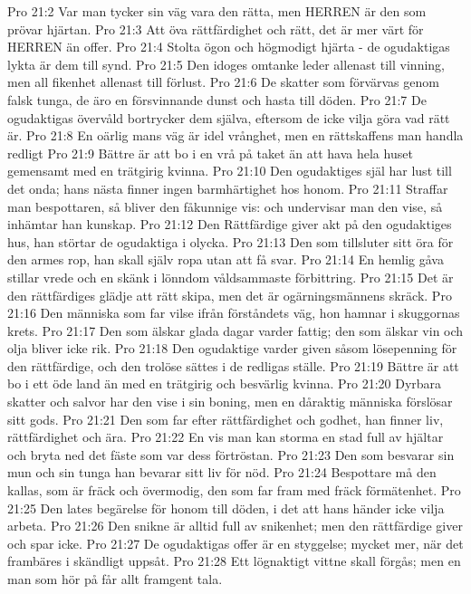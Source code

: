 Pro 21:2  Var man tycker sin väg vara den rätta, men HERREN är den som prövar hjärtan.
Pro 21:3  Att öva rättfärdighet och rätt, det är mer värt för HERREN än offer.
Pro 21:4  Stolta ögon och högmodigt hjärta - de ogudaktigas lykta är dem till synd.
Pro 21:5  Den idoges omtanke leder allenast till vinning, men all fikenhet allenast till förlust.
Pro 21:6  De skatter som förvärvas genom falsk tunga, de äro en försvinnande dunst och hasta till döden.
Pro 21:7  De ogudaktigas övervåld bortrycker dem själva, eftersom de icke vilja göra vad rätt är.
Pro 21:8  En oärlig mans väg är idel vrånghet, men en rättskaffens man handla redligt
Pro 21:9  Bättre är att bo i en vrå på taket än att hava hela huset gemensamt med en trätgirig kvinna.
Pro 21:10  Den ogudaktiges själ har lust till det onda; hans nästa finner ingen barmhärtighet hos honom.
Pro 21:11  Straffar man bespottaren, så bliver den fåkunnige vis: och undervisar man den vise, så inhämtar han kunskap.
Pro 21:12  Den Rättfärdige giver akt på den ogudaktiges hus, han störtar de ogudaktiga i olycka.
Pro 21:13  Den som tillsluter sitt öra för den armes rop, han skall själv ropa utan att få svar.
Pro 21:14  En hemlig gåva stillar vrede och en skänk i lönndom våldsammaste förbittring.
Pro 21:15  Det är den rättfärdiges glädje att rätt skipa, men det är ogärningsmännens skräck.
Pro 21:16  Den människa som far vilse ifrån förståndets väg, hon hamnar i skuggornas krets.
Pro 21:17  Den som älskar glada dagar varder fattig; den som älskar vin och olja bliver icke rik.
Pro 21:18  Den ogudaktige varder given såsom lösepenning för den rättfärdige, och den trolöse sättes i de redligas ställe.
Pro 21:19  Bättre är att bo i ett öde land än med en trätgirig och besvärlig kvinna.
Pro 21:20  Dyrbara skatter och salvor har den vise i sin boning, men en dåraktig människa förslösar sitt gods.
Pro 21:21  Den som far efter rättfärdighet och godhet, han finner liv, rättfärdighet och ära.
Pro 21:22  En vis man kan storma en stad full av hjältar och bryta ned det fäste som var dess förtröstan.
Pro 21:23  Den som besvarar sin mun och sin tunga han bevarar sitt liv för nöd.
Pro 21:24  Bespottare må den kallas, som är fräck och övermodig, den som far fram med fräck förmätenhet.
Pro 21:25  Den lates begärelse för honom till döden, i det att hans händer icke vilja arbeta.
Pro 21:26  Den snikne är alltid full av snikenhet; men den rättfärdige giver och spar icke.
Pro 21:27  De ogudaktigas offer är en styggelse; mycket mer, när det frambäres i skändligt uppsåt.
Pro 21:28  Ett lögnaktigt vittne skall förgås; men en man som hör på får allt framgent tala.
